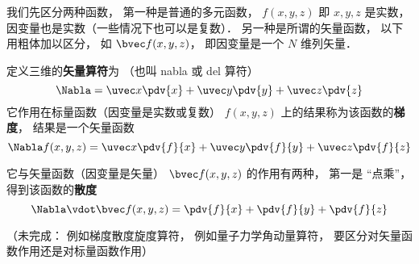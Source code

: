 

我们先区分两种函数， 第一种是普通的多元函数， $f(x, y, z)$ 即 $x, y, z$ 是实数， 因变量也是实数（一些情况下也可以是复数）． 另一种是所谓的矢量函数， 以下用粗体加以区分， 如 $\bvec f(x, y, z)$， 即因变量是一个 $N$ 维列矢量．

定义三维的\textbf{矢量算符}为 （也叫 nabla 或 del 算符）
\begin{equation}
\Nabla = \uvec x \pdv{x} + \uvec y \pdv{y} + \uvec z \pdv{z}
\end{equation}
它作用在标量函数（因变量是实数或复数） $f(x, y, z)$ 上的结果称为该函数的\textbf{梯度}， 结果是一个矢量函数
\begin{equation}
\Nabla f(x, y, z) = \uvec x \pdv{f}{x} + \uvec y \pdv{f}{y} + \uvec z \pdv{f}{z}
\end{equation}


它与矢量函数（因变量是矢量） $\bvec f(x, y, z)$ 的作用有两种， 第一是 “点乘”， 得到该函数的\textbf{散度}
\begin{equation}
\Nabla \vdot \bvec f(x, y, z) = \pdv{f}{x} + \pdv{f}{y} + \pdv{f}{z}
\end{equation}


（未完成： 例如梯度散度旋度算符， 例如量子力学角动量算符， 要区分对矢量函数作用还是对标量函数作用）
